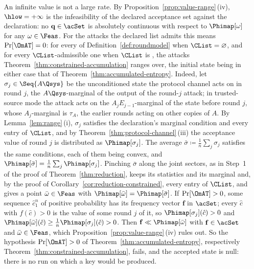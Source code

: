 
\begin{remark}\label{rem:hlow-range}
An infinite value is not a large rate. By
Proposition~\ref{prop:value-range}\,(iv), $\hlow=+\infty$ is the
infeasibility of the declared acceptance set against the declaration: no
$\mathbf q\in\acSet$ is absolutely continuous with respect to
$\Phimap[\omega]$ for any $\omega\in\Feas$. For the attacks the declared
list admits this means $\Pr[\OmAT]=0$: for every  of
Definition~\ref{def:roundmodel} when $\CList=\varnothing$, and for every
$\CList$-admissible one when $\CList$ is
, the attacks
Theorem~\ref{thm:constrained-accumulation} ranges over, the initial state
being in either case that of Theorem~\ref{thm:accumulated-entropy}.
Indeed, let $\sigma_j\in\Seq{A\Qsys}$ be the unconditioned state the
protocol channel acts on in round $j$, the $A\Qsys$-marginal of the output
of the round-$j$ attack; in trusted-source mode the attack acts on the
$A_jE_{j-1}$-marginal of the state before round $j$, whose $A_j$-marginal
is $\tau_A$, the earlier rounds acting on other copies of $A$. By
Lemma~\ref{lem:range}\,(i), $\sigma_j$ satisfies the declaration's marginal
condition and every entry of $\CList$, and by
Theorem~\ref{thm:protocol-channel}\,(iii) the acceptance value of round $j$
is distributed as $\Phimap[\sigma_j]$. The average
$\bar\sigma\coloneqq\frac1n\sum_j\sigma_j$ satisfies the same conditions,
each of them being convex, and
$\Phimap[\bar\sigma]=\frac1n\sum_j\Phimap[\sigma_j]$. Pinching
$\bar\sigma$ along the joint sectors, as in Step~1 of the proof of
Theorem~\ref{thm:reduction}, keeps its statistics and its marginal and, by
the proof of Corollary~\ref{cor:reduction-constrained}, every entry of
$\CList$, and gives a point $\bar\omega\in\Feas$ with
$\Phimap[\bar\omega]=\Phimap[\bar\sigma]$. If $\Pr[\OmAT]>0$, some sequence
$\hat c_1^n$ of positive probability has its frequency vector $\mathbf f$
in $\acSet$; every $\hat c$ with $f(\hat c)>0$ is the value of some round
$j$ of it, so $\Phimap[\sigma_j](\hat c)>0$ and
$\Phimap[\bar\omega](\hat c)\ge\frac1n\Phimap[\sigma_j](\hat c)>0$. Then
$\mathbf f\ll\Phimap[\bar\omega]$ with $\mathbf f\in\acSet$ and
$\bar\omega\in\Feas$, which Proposition~\ref{prop:value-range}\,(iv) rules
out. So the hypothesis $\Pr[\OmAT]>0$ of
Theorem~\ref{thm:accumulated-entropy}, respectively
Theorem~\ref{thm:constrained-accumulation}, fails, and the accepted state
is null: there is no run on which a key would be produced.


\end{remark}
